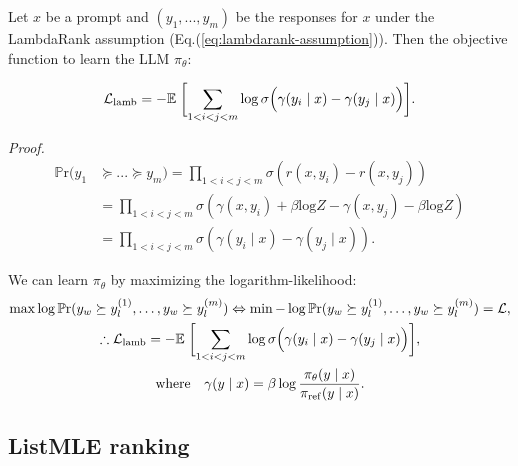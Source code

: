 \begin{theorem}
Let \( x \) be a prompt and \( (y_1, ..., y_m)  \) be the responses for \( x \) under the LambdaRank assumption (Eq.(\ref{eq:lambdarank-assumption})).
Then the objective function to learn the LLM \( \pi_\theta \):
\end{theorem}

\begin{gather}
    \mathcal{L}_{\text{lamb}}=-\mathbb{E}\;\biggl[ \sum_{1<i<j<m}
   \log \sigma\Bigl(
     \gamma(y_i \mid x)-
     \gamma(y_j \mid x)
   \Bigr)
\biggr].
\end{gather}

\textit{Proof.}
\begin{equation}
\begin{aligned}
\mathbb{P}\text{r}(y_1 & \succeq ... \succeq y_m)
= \prod_{1<i<j<m} \sigma(r(x,y_i) - r(x,y_j)) \\
&= \prod_{1<i<j<m} \sigma(\gamma(x,y_i) + \beta \text{log} Z - \gamma(x,y_j) - \beta \text{log} Z)  \\
&= \prod_{1<i<j<m} \sigma(\gamma(y_i \mid x)-
     \gamma(y_j \mid x)).
\end{aligned}
\end{equation}

We can learn $\pi_\theta$ by maximizing the logarithm-likelihood: 
\begin{gather}
\max \log \mathbb{P}\text{r}(y_w \succeq y^{(1)}_l, \dots, y_w \succeq y^{(m)}_l) \Leftrightarrow 
\min - \log \mathbb{P}\text{r}(y_w \succeq y^{(1)}_l, \dots, y_w \succeq y^{(m)}_l) = \mathcal{L}, \\
 \therefore \mathcal{L}_{\text{lamb}}=-\mathbb{E}\;\biggl[ \sum_{1<i<j<m}
   \log \sigma\Bigl(
     \gamma(y_i \mid x)-
     \gamma(y_j \mid x)
   \Bigr)
\biggr], \\
\text{where} \quad \gamma(y \mid x) = \beta \log \frac{\pi_\theta(y \mid x)}{\pi_{\mathrm{ref}}(y \mid x)}.
\end{gather}


\subsection{ListMLE ranking}\label{apx:proof:listmle}

